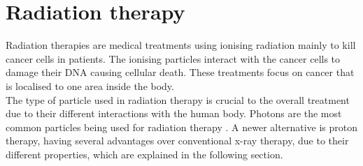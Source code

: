 %
%

\chapter{Radiation therapy}
Radiation therapies \cite{med} are medical treatments using ionising radiation mainly to kill cancer cells in patients. The ionising particles interact with the
cancer cells to damage their DNA causing cellular death. These treatments focus on cancer that is localised to one area inside the body. \\
The type of particle used in radiation therapy is crucial to the overall treatment due to their different interactions with the human body.
Photons are the most common particles being used for radiation therapy \cite{pbt}.
A newer alternative is proton therapy, having several advantages over conventional x-ray therapy, due to their different properties, which are explained in the following section.


